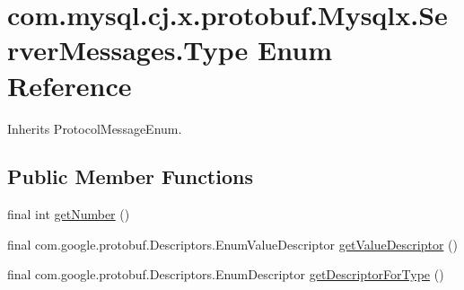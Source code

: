 \hypertarget{enumcom_1_1mysql_1_1cj_1_1x_1_1protobuf_1_1_mysqlx_1_1_server_messages_1_1_type}{}\section{com.\+mysql.\+cj.\+x.\+protobuf.\+Mysqlx.\+Server\+Messages.\+Type Enum Reference}
\label{enumcom_1_1mysql_1_1cj_1_1x_1_1protobuf_1_1_mysqlx_1_1_server_messages_1_1_type}


Inherits Protocol\+Message\+Enum.

\subsection*{Public Member Functions}
\begin{DoxyCompactItemize}
\item 
final int \mbox{\hyperlink{enumcom_1_1mysql_1_1cj_1_1x_1_1protobuf_1_1_mysqlx_1_1_server_messages_1_1_type_ac185c37952e211db6691f48b49679941}{get\+Number}} ()
\item 
final com.\+google.\+protobuf.\+Descriptors.\+Enum\+Value\+Descriptor \mbox{\hyperlink{enumcom_1_1mysql_1_1cj_1_1x_1_1protobuf_1_1_mysqlx_1_1_server_messages_1_1_type_a2480cd91ef6126c779cf0d180ebaa606}{get\+Value\+Descriptor}} ()
\item 
final com.\+google.\+protobuf.\+Descriptors.\+Enum\+Descriptor \mbox{\hyperlink{enumcom_1_1mysql_1_1cj_1_1x_1_1protobuf_1_1_mysqlx_1_1_server_messages_1_1_type_a45b68e7307b5f5a7b6ed300fa58111c6}{get\+Descriptor\+For\+Type}} ()
\end{DoxyCompactItemize}
